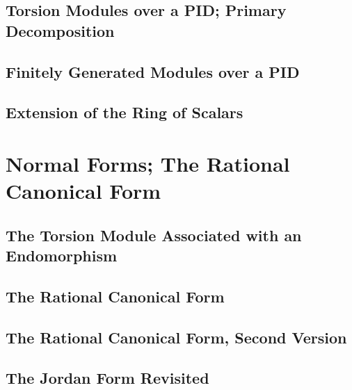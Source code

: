 \documentclass[a4paper]{article}
\begin{document}
\subsection{ Torsion Modules over a PID; Primary Decomposition} %

\subsection{ Finitely Generated Modules over a PID} %

\subsection{ Extension of the Ring of Scalars} %


\newpage
\section{Normal Forms; The Rational Canonical Form}
\subsection{ The Torsion Module Associated with an Endomorphism} %

\subsection{ The Rational Canonical Form} %

\subsection{ The Rational Canonical Form, Second Version} %

\subsection{ The Jordan Form Revisited} %
\end{document}
